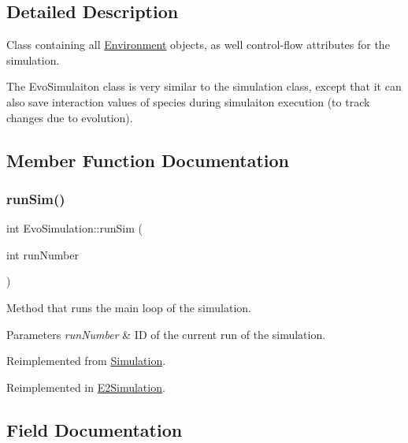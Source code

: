 \subsection{Detailed Description}
Class containing all \hyperlink{classEnvironment}{Environment} objects, as well control-\/flow attributes for the simulation. 

The Evo\+Simulaiton class is very similar to the simulation class, except that it can also save interaction values of species during simulaiton execution (to track changes due to evolution). 

\subsection{Member Function Documentation}
\mbox{\label{classEvoSimulation_aa43aa351dec24c638e56995a67a4f0f5}} 
\subsubsection{\texorpdfstring{run\+Sim()}{runSim()}}
{\footnotesize\ttfamily int Evo\+Simulation\+::run\+Sim (\begin{DoxyParamCaption}\item[{int}]{run\+Number }\end{DoxyParamCaption})\hspace{0.3cm}{\ttfamily [virtual]}}



Method that runs the main loop of the simulation. 


\begin{DoxyParams}{Parameters}
{\em run\+Number} & ID of the current run of the simulation. \\
\hline
\end{DoxyParams}


Reimplemented from \hyperlink{classSimulation_a7eb16da89581b496d33b77efbb63b9cd}{Simulation}.



Reimplemented in \hyperlink{classE2Simulation_a28028881fd443d2445b562512cb2169c}{E2\+Simulation}.



\subsection{Field Documentation}
\mbox{\label{classEvoSimulation_aced0330991a4c4ed3bf726e5909fbd31}} 
